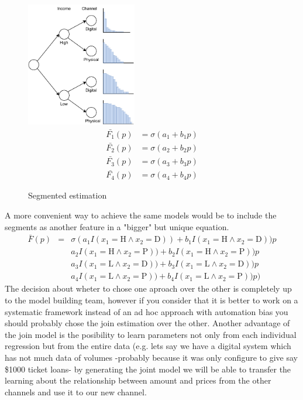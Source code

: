 \begin{figure}[H]
  \centering
    \begin{multicols}{2}
      \includegraphics[width=0.43\textwidth]{wtp_segment.pdf} 
    \vfill\null
    \columnbreak
\begin{equation}
    \begin{aligned}
        \bar{F_1}(p) &= \sigma(a_1+b_1p) \\[40pt]
        \bar{F_2}(p) &= \sigma(a_2+b_2p)  \\[40pt]
        \bar{F_3}(p) &= \sigma(a_3+b_3p) \\[40pt]
        \bar{F_4}(p) &= \sigma(a_4+b_4p) 
    \end{aligned} \nonumber
\end{equation}
    \end{multicols}
 \caption{Segmented estimation}
 \label{fig:segmentation}
\end{figure}

A more convenient way to achieve the same models would be to include the segments as another feature in a "bigger" but unique equation. 
\begin{equation}
    \begin{aligned}
    \bar{F}(p) &=& \sigma(a_1I(x_1=\text{H} \wedge x_2=\text{D}) )+b_1 I(x_1=\text{H} \wedge x_2=\text{D}) ) p \\
    & &a_2I(x_1=\text{H} \wedge x_2=\text{P}) )+b_2 I(x_1=\text{H} \wedge x_2=\text{P}) ) p \\
    & &a_3I(x_1=\text{L} \wedge x_2=\text{D}) )+b_3 I(x_1=\text{L} \wedge x_2=\text{D}) ) p \\
    & &a_4I(x_1=\text{L} \wedge x_2=\text{P}) )+b_4 I(x_1=\text{L} \wedge x_2=\text{P}) ) p ) 
    \end{aligned} \label{eq_dummies}
\end{equation}
The decision about wheter to chose one aproach over the other is completely up to the model building team, however if you consider that it is better to work on a systematic framework instead of an ad hoc approach with automation bias you should probably chose the join estimation over the other. Another advantage of the join model is the posibility to learn parameters not only from each individual regression but from the entire data (e.g. lets say we have a digital system which has not much data of volumes -probably because it was only configure to give say \$1000 ticket loans- by generating the joint model we will be able to transfer the learning about the relationship between amount and prices from the other channels and use it to our new channel.
